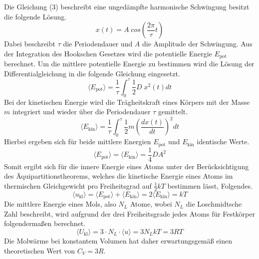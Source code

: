 Die Gleichung (3) beschreibt eine ungedämpfte harmonische Schwingung besitzt die folgende Lösung.
\begin{equation}
    x(t) = A \; cos \left (\frac{2\pi}{\tau}t \right )
\end{equation}
Dabei beschreibt $\tau$ die Periodendauer und $A$ die Amplitude der Schwingung.
Aus der Integration des Hookschen Gesetzes wird die potentielle Energie $E_\text{pot}$ berechnet.
Um die mittlere potentielle Energie zu bestimmen wird die Lösung der Differentialgleichung in die folgende Gleichung eingesetzt.
\begin{equation}
    \langle	E_\text{pot}\rangle = \frac{1}{\tau} \int_0^\tau \! \frac{1}{2} D \; x^{2}(t) dt
\end{equation}
Bei der kinetischen Energie wird die Trägheitskraft eines Körpers mit der Masse $m$ integriert und wieder über die Periodendauer $\tau$ gemittelt.
\begin{equation}
    \langle E_\text{kin} \rangle = \frac{1}{\tau} \int_0^\tau \! \frac{1}{2} m \left ( \frac{dx(t)}{dt}\right )^{2} dt 
\end{equation}
Hierbei ergeben sich für beide mittlere Energien $E_\text{pot}$ und $E_\text{kin}$ identische Werte.
\begin{equation}
    \langle E_\text{pot} \rangle = \langle E_\text{kin} \rangle = \frac{1}{4} D A^{2}
\end{equation}
Somit ergibt sich für die innere Energie eines Atoms unter der Berücksichtigung des Äquipartitionstheorems, welches die kinetische Energie eines Atoms im thermischen Gleichgewicht pro Freiheitsgrad auf $\frac{1}{2}kT$ bestimmen lässt, Folgendes.
\begin{equation}
    \langle u_\text{kl} \rangle = \langle E_\text{pot} \rangle + \langle E_\text{kin} \rangle = 2 \langle E_\text{kin} \rangle = kT
\end{equation}
Die mittlere Energie eines Mols, also $N_L$ Atome, wobei $N_L$ die Loschmidtsche Zahl beschreibt, wird aufgrund der drei Freiheitsgrade jedes Atoms für Festkörper folgendermaßen berechnet.
\begin{equation}
    \langle U_\text{kl} \rangle = 3 \cdot N_L \cdot \langle u \rangle = 3 N_L k T = 3 R T
\end{equation}
Die Molwärme bei konstantem Volumen hat daher erwartungsgemäß einen theoretischen Wert von $C_V = 3R$.

